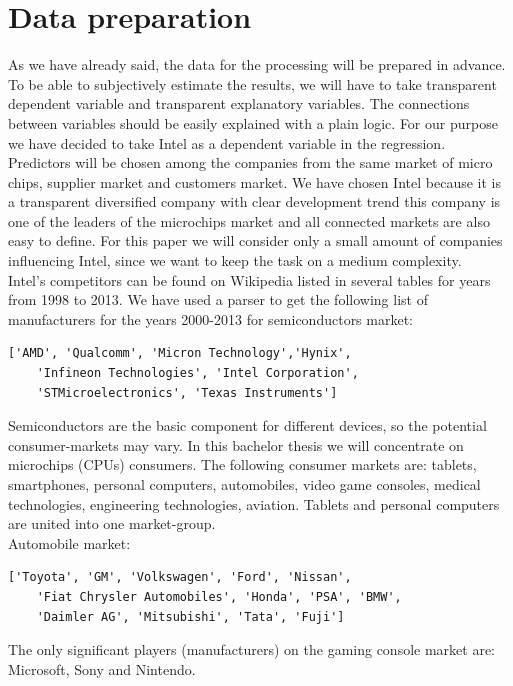 \documentclass[
  twoside,
  11pt, a4paper,
  footinclude=true,
  headinclude=true,
  cleardoublepage=empty
]{scrreprt}
\begin{document}
    \section{Data preparation}
    As we have already said, the data for the processing will be prepared in advance. To be able to subjectively estimate the results, we will have to take transparent dependent variable and transparent explanatory variables. The connections between variables should be easily explained with a plain logic. For our purpose we have decided to take Intel as a dependent variable in the regression. Predictors will be chosen among the companies from the same market of micro chips, supplier market and customers market. We have chosen Intel because it is a transparent diversified company with clear development trend this company is one of the leaders of the microchips market and all connected markets are also easy to define. For this paper we will consider only a small amount of companies influencing Intel, since we want to keep the task on a medium complexity.\\
    Intel's competitors can be found on Wikipedia listed in several tables for years from 1998 to 2013. We have used a parser to get the following list of manufacturers for the years 2000-2013 for semiconductors market:
    \begin{lstlisting}[basicstyle=\footnotesize]
    ['AMD', 'Qualcomm', 'Micron Technology','Hynix',
    'Infineon Technologies', 'Intel Corporation', 
    'STMicroelectronics', 'Texas Instruments']
    \end{lstlisting}
    Semiconductors are the basic component for different devices, so the potential consumer-markets may vary. In this bachelor thesis we will concentrate on microchips (CPUs) consumers. The following consumer markets are: tablets, smartphones, personal computers, automobiles, video game consoles, medical technologies, engineering technologies, aviation. Tablets and personal computers are united into one market-group.\\
    Automobile market:
    \vspace{0.5cm}
    \begin{lstlisting}[basicstyle=\footnotesize]
    ['Toyota', 'GM', 'Volkswagen', 'Ford', 'Nissan', 
    'Fiat Chrysler Automobiles', 'Honda', 'PSA', 'BMW',
    'Daimler AG', 'Mitsubishi', 'Tata', 'Fuji']
    \end{lstlisting}
    The only significant players (manufacturers) on the gaming console market are: Microsoft, Sony and Nintendo.\\ 
\end{document}
